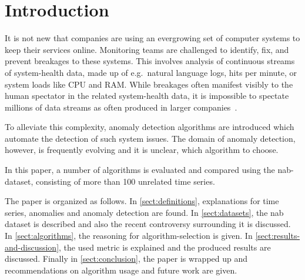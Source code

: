 \section{Introduction}
It is not new that companies are using an evergrowing set of computer systems
to keep their services online. Monitoring teams are challenged to identify, fix,
and prevent breakages to these systems. This involves analysis of continuous
streams of system-health data, made up of e.g.\ natural language logs, hits per
minute, or system loads like CPU and RAM\@. While breakages often manifest visibly
to the human spectator in the related system-health data, it is impossible to spectate
millions of data streams as often produced in larger companies~\cite[cf.][]{Zhu.2017}.

To alleviate this complexity, anomaly detection algorithms are introduced
which automate the detection of such system issues. The domain of anomaly detection,
however, is frequently evolving and it is unclear, which algorithm to choose.

In this paper, a number of algorithms is evaluated and compared using the
\gls{nab}-dataset, consisting of more than 100 unrelated time series.

The paper is organized as follows. In \cref{sect:definitions}, explanations for
time series, anomalies and anomaly detection are found. In \cref{sect:datasets},
the \gls{nab} dataset is described and also the recent controversy surrounding
it is discussed. In \cref{sect:algorithms}, the reasoning for algorithm-selection
is given. In \cref{sect:results-and-discussion}, the used metric is explained
and the produced results are discussed. Finally in \cref{sect:conclusion}, the
paper is wrapped up and recommendations on algorithm usage and future work are
given.